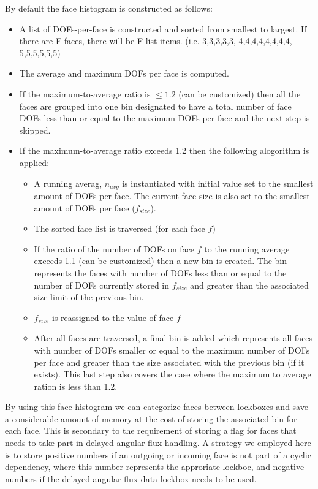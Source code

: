 \documentclass[11pt,letterpaper,titlepage]{article}
\numberwithin{equation}{section}
\begin{document}
\vspace{0.25in}
By default the face histogram is constructed as follows:
\begin{itemize}
\item A list of DOFs-per-face is constructed and sorted from smallest to largest. If there are F faces, there will be F list items. (i.e. 3,3,3,3,3, 4,4,4,4,4,4,4,4, 5,5,5,5,5,5)
\item The average and maximum DOFs per face is computed.
\item If the maximum-to-average ratio is $\le 1.2$ (can be customized) then all the faces are grouped into one bin designated to have a total number of face DOFs less than or equal to the maximum DOFs per face and the next step is skipped.
\item If the maximum-to-average ratio exceeds 1.2 then the following alogorithm is applied:
\begin{itemize}
\item A running averag, $n_{avg}$ is instantiated with initial value set to the smallest amount of DOFs per face. The current face size is also set to the smallest amount of DOFs per face ($f_{size}$).
\item The sorted face list is traversed (for each face $f$)
\item If the ratio of the number of DOFs on face $f$ to the running average exceeds 1.1 (can be customized) then a new bin is created. The bin represents the faces with number of DOFs less than or equal to the number of DOFs currently stored in $f_{size}$ and greater than the associated size limit of the previous bin.
\item $f_{size}$ is reassigned to the value of face $f$
\item After all faces are traversed, a final bin is added which represents all faces with number of DOFs smaller or equal to the maximum number of DOFs per face and greater than the size associated with the previous bin (if it exists). This last step also covers the case where the maximum to average ration is less than 1.2.
\end{itemize}
\end{itemize}

\vspace{0.25in}
By using this face histogram we can categorize faces between lockboxes and save a considerable amount of memory at the cost of storing the associated bin for each face. This is secondary to the requirement of storing a flag for faces that needs to take part in delayed angular flux handling. A strategy we employed here is to store positive numbers if an outgoing or incoming face is not part of a cyclic dependency, where this number represents the approriate lockboc, and negative numbers if the delayed angular flux data lockbox needs to be used.
\end{document}
